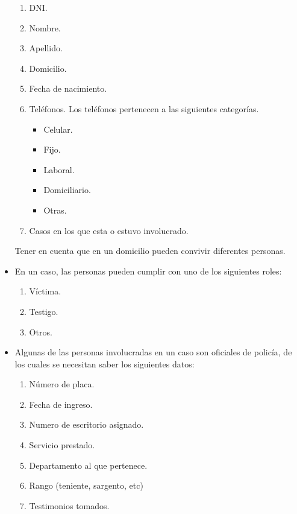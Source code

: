 \documentclass{article}
\theoremstyle{definition}
\theoremstyle{remark}
\begin{document}
\begin{itemize}
        \begin{enumerate}
            \item DNI.
            \item Nombre.
            \item Apellido.
            \item Domicilio.
            \item Fecha de nacimiento.
            \item Teléfonos. Los teléfonos pertenecen a las siguientes categorías.
                    \begin{itemize}
                        \item Celular.
                        \item Fijo.
                        \item Laboral.
                        \item Domiciliario.
                        \item Otras.
                    \end{itemize}
            \item Casos en los que esta o estuvo involucrado.
        \end{enumerate}
    Tener en cuenta que en un domicilio pueden convivir diferentes personas.
    \item En un caso, las personas pueden cumplir con uno de los siguientes roles:
        \begin{enumerate}
            \item Víctima.
            \item Testigo.
            \item Otros.
        \end{enumerate}
    \item Algunas de las personas involucradas en un caso son oficiales de policía, de los cuales se necesitan saber los siguientes datos:
        \begin{enumerate}
            \item Número de placa.
            \item Fecha de ingreso.
            \item Numero de escritorio asignado.
            \item Servicio prestado.
            \item Departamento al que pertenece.
            \item Rango (teniente, sargento, etc)
            \item Testimonios tomados.
        \end{enumerate}

\end{itemize}
\end{document}
